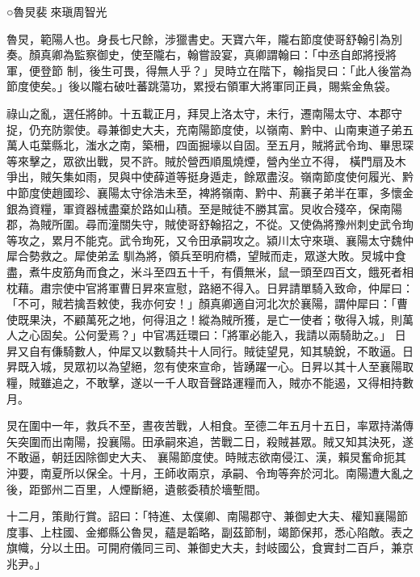 
\begin{pinyinscope}

 ○魯炅裴來瑱周智光



 魯炅，範陽人也。身長七尺餘，涉獵書史。天寶六年，隴右節度使哥舒翰引為別奏。顏真卿為監察御史，使至隴右，翰嘗設宴，真卿謂翰曰：「中丞自郎將授將軍，便登節
 制，後生可畏，得無人乎？」炅時立在階下，翰指炅曰：「此人後當為節度使矣。」後以隴右破吐蕃跳蕩功，累授右領軍大將軍同正員，賜紫金魚袋。



 祿山之亂，選任將帥。十五載正月，拜炅上洛太守，未行，遷南陽太守、本郡守捉，仍充防禦使。尋兼御史大夫，充南陽節度使，以嶺南、黔中、山南東道子弟五萬人屯葉縣北，滍水之南，築柵，四面掘壕以自固。至五月，賊將武令珣、畢思琛等來擊之，眾欲出戰，炅不許。賊於營西順風燒煙，營內坐立不得，
 橫門扇及木爭出，賊矢集如雨，炅與中使薛道等挺身遁走，餘眾盡沒。嶺南節度使何履光、黔中節度使趙國珍、襄陽太守徐浩未至，裨將嶺南、黔中、荊襄子弟半在軍，多懷金銀為資糧，軍資器械盡棄於路如山積。至是賊徒不勝其富。炅收合殘卒，保南陽郡，為賊所圍。尋而潼關失守，賊使哥舒翰招之，不從。又使偽將豫州刺史武令珣等攻之，累月不能克。武令珣死，又令田承嗣攻之。潁川太守來瑱、襄陽太守魏仲犀合勢救之。犀使弟孟
 馴為將，領兵至明府橋，望賊而走，眾遂大敗。炅城中食盡，煮牛皮筋角而食之，米斗至四五十千，有價無米，鼠一頭至四百文，餓死者相枕藉。肅宗使中官將軍曹日昇來宣慰，路絕不得入。日昇請單騎入致命，仲犀曰：「不可，賊若擒吾敕使，我亦何安！」顏真卿適自河北次於襄陽，謂仲犀曰：「曹使既果決，不顧萬死之地，何得沮之！縱為賊所獲，是亡一使者；敬得入城，則萬人之心固矣。公何愛焉？」中官馮廷環曰：「將軍必能入，我請以兩騎助之。」
 日昇又自有傔騎數人，仲犀又以數騎共十人同行。賊徒望見，知其驍銳，不敢逼。日昇既入城，炅眾初以為望絕，忽有使來宣命，皆踴躍一心。日昇以其十人至襄陽取糧，賊雖追之，不敢擊，遂以一千人取音聲路運糧而入，賊亦不能遏，又得相持數月。



 炅在圍中一年，救兵不至，晝夜苦戰，人相食。至德二年五月十五日，率眾持滿傳矢突圍而出南陽，投襄陽。田承嗣來追，苦戰二日，殺賊甚眾。賊又知其決死，遂不敢逼，朝廷因除御史大夫、
 襄陽節度使。時賊志欲南侵江、漢，賴炅奮命扼其沖要，南夏所以保全。十月，王師收兩京，承嗣、令珣等奔於河北。南陽遭大亂之後，距鄧州二百里，人煙斷絕，遺骸委積於墻塹間。



 十二月，策勛行賞。詔曰：「特進、太僕卿、南陽郡守、兼御史大夫、權知襄陽節度事、上柱國、金鄉縣公魯炅，蘊是韜略，副茲節制，竭節保邦，悉心陷敵。表之旗幟，分以土田。可開府儀同三司、兼御史大夫，封岐國公，食實封二百戶，兼京兆尹。」




\end{pinyinscope}
